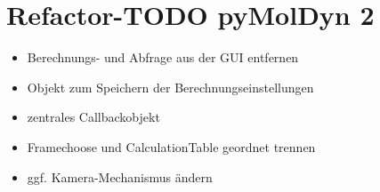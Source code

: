 \documentclass[a4paper,12pt]{scrartcl}
\begin{document}
\section*{Refactor-TODO pyMolDyn 2}
\begin{itemize}
	\item Berechnungs- und Abfrage aus der GUI entfernen
	\item Objekt zum Speichern der Berechnungseinstellungen
	\item zentrales Callbackobjekt
	\item Framechoose und CalculationTable geordnet trennen
	\item ggf. Kamera-Mechanismus ändern
\end{itemize}
\end{document}
